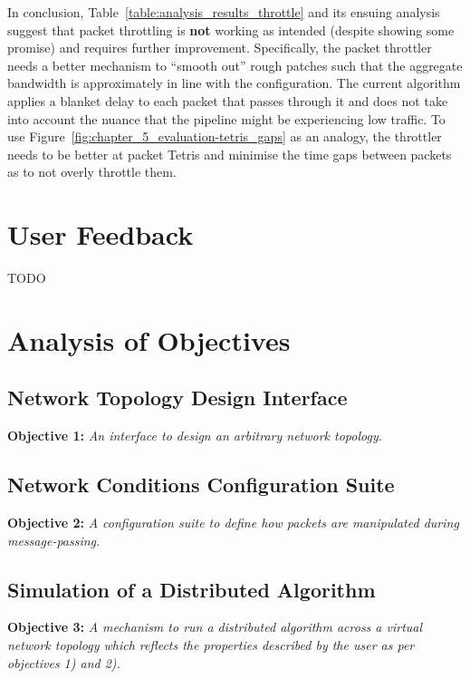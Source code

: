 In conclusion, Table~\ref{table:analysis_results_throttle} and its ensuing analysis suggest that packet throttling is
\textbf{not} working as intended (despite showing some promise) and requires further improvement. Specifically, the
packet throttler needs a better mechanism to ``smooth out'' rough patches such that the aggregate bandwidth is
approximately in line with the configuration. The current algorithm applies a blanket delay to each packet that
passes through it and does not take into account the nuance that the pipeline might be experiencing low traffic. To
use Figure~\ref{fig:chapter_5_evaluation-tetris_gaps} as an analogy, the throttler needs to be better at packet
Tetris and minimise the time gaps between packets as to not overly throttle them.


\section{User Feedback}\label{section:user_feedback}

TODO


\section{Analysis of Objectives}\label{section:analysis_of_objectives}

\subsection{Network Topology Design Interface}\label{subsection:network_topology_design_interface}

\textbf{Objective 1: }\emph{An interface to design an arbitrary network topology.}

\subsection{Network Conditions Configuration Suite}\label{subsection:network_conditions_configuration_suite }

\textbf{Objective 2: }\emph{A configuration suite to define how packets are manipulated during message-passing.}

\subsection{Simulation of a Distributed Algorithm}\label{subsection:simulation_of_a_distributed_algorithm}

\textbf{Objective 3: }\emph{A mechanism to run a distributed algorithm across a virtual network topology which
reflects the
properties described by the user as per objectives 1) and 2).}

